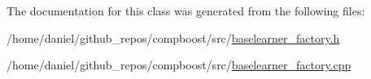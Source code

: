 The documentation for this class was generated from the following files\+:\begin{DoxyCompactItemize}
\item 
/home/daniel/github\+\_\+repos/compboost/src/\hyperlink{baselearner__factory_8h}{baselearner\+\_\+factory.\+h}\item 
/home/daniel/github\+\_\+repos/compboost/src/\hyperlink{baselearner__factory_8cpp}{baselearner\+\_\+factory.\+cpp}\end{DoxyCompactItemize}
